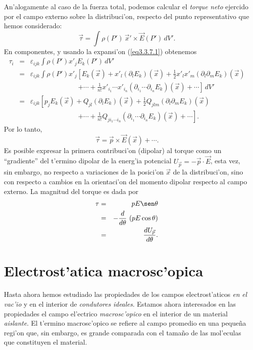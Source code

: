 An'alogamente al caso de la fuerza total, podemos calcular el \textit{torque
neto} ejercido por el campo externo sobre la distribuci'on, respecto del punto
representativo que hemos considerado:
\begin{equation}
\vec{\tau} = \int \rho(P')\,\vec{x}'\times\vec{E}(P')\,dV' .
\end{equation}
En componentes, y usando la expansi'on (\ref{eq3.3.7.1}) obtenemos
\begin{eqnarray}
\tau_i &=& \varepsilon_{ijk}\int\rho(P')x'_jE_k(P')\,dV' \\
&=&\varepsilon_{ijk}\int\rho(P')x'_j\left[
E_k(\vec{x})+x'_l(\partial_lE_k)(\vec{x})+\frac{1}{2}
x'_lx'_m(\partial_l\partial_mE_k)(\vec{x}) \right.\nonumber\\
&&\quad\qquad\qquad\qquad\left.+\cdots+\frac{1}{n!}x'_{i_1}\cdots
x'_{i_n}(\partial_{i_1}\cdots\partial_{i_n}E_k)(\vec
{x})+\cdots\right] \,dV' \\
&=&\varepsilon_{ijk}\left[p_j
E_k(\vec{x})+Q_{jl}(\partial_lE_k)(\vec{x})+\frac{1}{2}
Q_{jlm}(\partial_l\partial_mE_k)(\vec{x})\right.\nonumber\\
&&\quad\qquad\qquad\qquad\left.+\cdots+\frac{1}{n!}Q_{ji_1\cdots i_n}(\partial_{i_1}\cdots\partial_{i_n}
E_k)(\vec
{x})+\cdots\right] .
\end{eqnarray}
Por lo tanto,
\begin{equation}
\label{eq3.3.14}
\boxed{\vec{\tau}=\vec{p}\times\vec{E}(\vec{x})+\cdots. }
\end{equation}
Es posible expresar la primera contribuci'on (dipolar) al torque como un
``gradiente'' del t'ermino dipolar de la energ'ia potencial
$U_{\vec{p}}=-\vec{p}\cdot\vec{E}$, esta vez, sin embargo, no respecto a
variaciones de la posici'on $\vec{x}$ de la distribuci'on, sino con respecto a
cambios en la orientaci'on del momento dipolar respecto al campo
externo. La magnitud del torque es dada por
\begin{eqnarray}
\tau &=& pE\sen\theta \nonumber \\
&=& -\frac{d}{d\theta}\,\left(pE\cos\theta\right)\\
&=&\frac{dU_{\vec{p}}}{d\theta}.  \label{eq3.3.15}
\end{eqnarray}

\newpage


\newpage

\section{Electrost'atica macrosc'opica}
Hasta ahora hemos estudiado las propiedades de los campos
electrost'aticos \textit{en el vac'io} y en el interior de \textit{condutores ideales}.
Estamos ahora interesados en las propiedades el campo el'ectrico \textit{macrosc'opico} en el interior de un material \textit{aislante}. El t'ermino macrosc'opico se refiere al campo promedio en una peque\~na regi'on que, sin embargo, es grande comparada con el tama\~no de las mol'eculas que constituyen el material.

